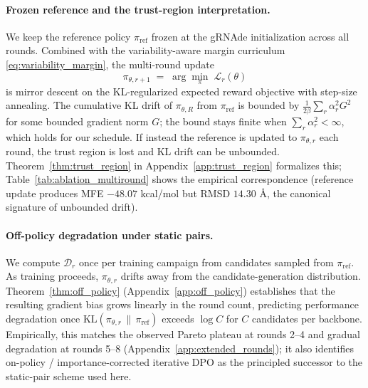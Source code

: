 \paragraph{Frozen reference and the trust-region interpretation.}
We keep the reference policy $\pi_{\mathrm{ref}}$ frozen at the gRNAde initialization across all rounds. Combined with the variability-aware margin curriculum \eqref{eq:variability_margin}, the multi-round update
\[
\pi_{\theta, r+1}\;=\;\arg\min_{\pi}\; \mathcal{L}_r(\theta)
\]
is mirror descent on the KL-regularized expected reward objective with step-size annealing. The cumulative KL drift of $\pi_{\theta, R}$ from $\pi_{\mathrm{ref}}$ is bounded by $\tfrac{1}{2\beta}\sum_r \alpha_r^2 G^2$ for some bounded gradient norm $G$; the bound stays finite when $\sum_r \alpha_r^2 < \infty$, which holds for our schedule. If instead the reference is updated to $\pi_{\theta, r}$ each round, the trust region is lost and KL drift can be unbounded. Theorem~\ref{thm:trust_region} in Appendix~\ref{app:trust_region} formalizes this; Table~\ref{tab:ablation_multiround} shows the empirical correspondence (reference update produces MFE $-48.07$ kcal/mol but RMSD $14.30$ \AA, the canonical signature of unbounded drift).

\paragraph{Off-policy degradation under static pairs.}
We compute $\mathcal{D}_r$ once per training campaign from candidates sampled from $\pi_{\mathrm{ref}}$. As training proceeds, $\pi_{\theta, r}$ drifts away from the candidate-generation distribution. Theorem~\ref{thm:off_policy} (Appendix~\ref{app:off_policy}) establishes that the resulting gradient bias grows linearly in the round count, predicting performance degradation once $\mathrm{KL}(\pi_{\theta, r}\,\|\,\pi_{\mathrm{ref}})$ exceeds $\log C$ for $C$ candidates per backbone. Empirically, this matches the observed Pareto plateau at rounds 2--4 and gradual degradation at rounds 5--8 (Appendix~\ref{app:extended_rounds}); it also identifies on-policy / importance-corrected iterative DPO as the principled successor to the static-pair scheme used here.



